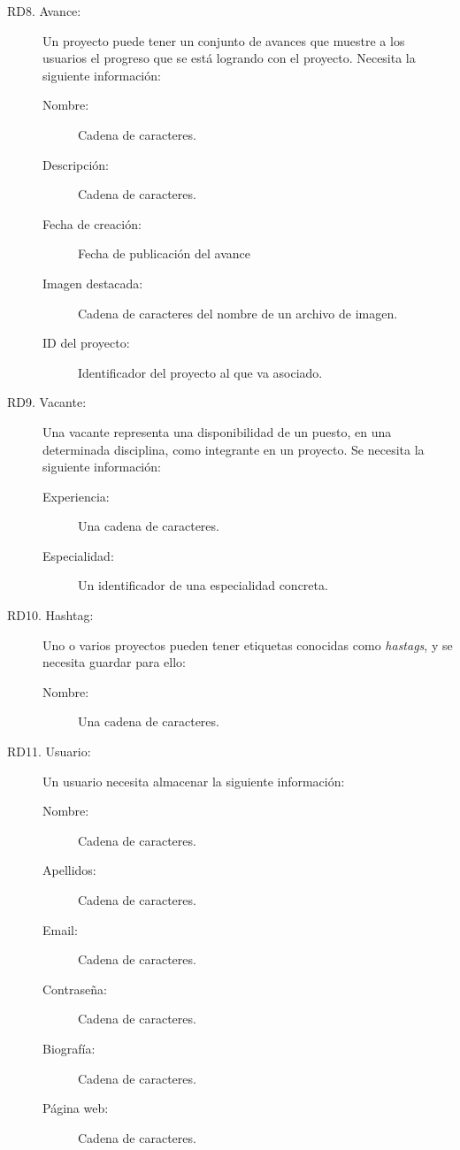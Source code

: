 \begin{description}
    \item[RD8. Avance:] Un proyecto puede tener un conjunto de avances que muestre a los usuarios el progreso que se está logrando con el proyecto. Necesita la siguiente información:
        \begin{description}
            \item[Nombre:] Cadena de caracteres.
            \item[Descripción:] Cadena de caracteres.
            \item[Fecha de creación:] Fecha de publicación del avance
            \item[Imagen destacada:] Cadena de caracteres del nombre de un archivo de imagen.
            \item[ID del proyecto:] Identificador del proyecto al que va asociado.
        \end{description}
    \item[RD9. Vacante:] Una vacante representa una disponibilidad de un puesto, en una determinada disciplina, como integrante en un proyecto. Se necesita la siguiente información:
        \begin{description}
            \item[Experiencia:] Una cadena de caracteres.
            \item[Especialidad:] Un identificador de una especialidad concreta.
        \end{description}
    \item[RD10. Hashtag:] Uno o varios proyectos pueden tener etiquetas conocidas como \textit{hastags}, y se necesita guardar para ello:
        \begin{description}
            \item[Nombre:] Una cadena de caracteres.
        \end{description}
    \item[RD11. Usuario:] Un usuario necesita almacenar la siguiente información:
        \begin{description}
            \item[Nombre:] Cadena de caracteres.
            \item[Apellidos:] Cadena de caracteres.
            \item[Email:] Cadena de caracteres.
            \item[Contraseña:] Cadena de caracteres.
            \item[Biografía:] Cadena de caracteres.
            \item[Página web:] Cadena de caracteres.

\end{description}
\end{description}
